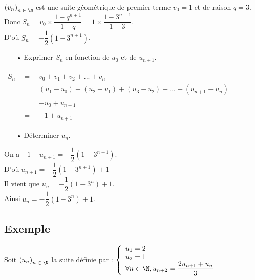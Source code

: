 $\left(v_n\right)_{n \; \in \; \N}$ est une suite géométrique de premier terme $v_0 = 1$ et de raison $q = 3$. \\

Donc $S_n = v_0 \times \dfrac{1 - q^{n+1}}{1 - q} = 1 \times \dfrac{1-3^{n+1}}{1 - 3}$. \\

D'où $S_n = -\dfrac{1}{2}\left(1-3^{n+1}\right)$. 

\vspace*{.3cm}

\begin{itemize}
\item[•] Exprimer $S_n$ en fonction de $u_0$ et de $u_{n+1}$. \\
\end{itemize}

\begin{tabular}{lll}
$S_n$ & $ = $ & $ v_0 + v_1 + v_2 + ... + v_n$ \\
& $=$ & $\left(u_1 - u_0\right) + \left(u_2-u_1\right) + \left(u_3 - u_2\right) + ... + \left(u_{n+1} - u_n\right)$ \\
& $=$ & $-u_0 + u_{n+1}$ \\
& $=$ & $-1 + u_{n+1}$ \\
\end{tabular}

\vspace*{.3cm}

\begin{itemize}
\item[•] Déterminer $u_n$. \\
\end{itemize}

On a $-1 + u_{n+1} = -\dfrac{1}{2}\left(1 - 3^{n+1}\right)$. \\

D'où $u_{n+1} = -\dfrac{1}{2}\left(1-3^{n+1}\right) + 1$ \\

Il vient que $u_n = -\dfrac{1}{2}\left(1 - 3^n\right) + 1$. \\

Ainsi $u_n = -\dfrac{1}{2}\left(1 - 3^n\right) + 1$. \\

\newpage

\subsection{Exemple }

Soit $\left(u_n\right)_{n\; \in \; \N}$ la suite définie par : $\left\{
  \begin{array}{lll}
    u_1 = 2 \\
    u_2 = 1 \\
    \forall n \in \N, u_{n+2} = \dfrac{2u_{n+1} + u_n}{3}
  \end{array}
\right.$

